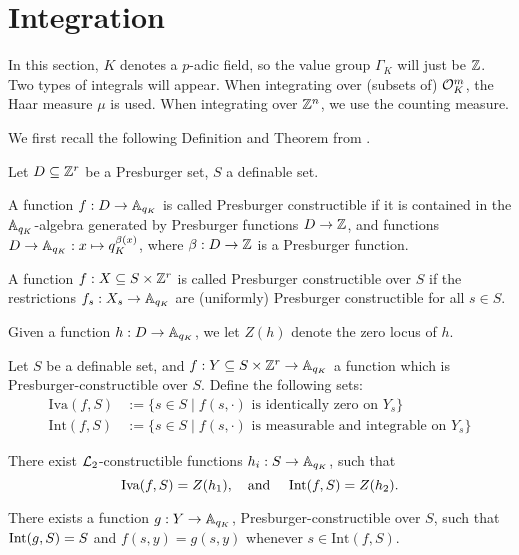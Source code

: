 \section{Integration} \label{sec:integration}
In this section, $K$ denotes a $p$-adic field, so the value group $\Gamma_K$ will just be $\Z$. Two types of integrals will appear. When integrating over (subsets of) $\cO_K^m$, the Haar measure $\mu$ is used. When integrating over $\Z^n$, we use the counting measure.

We first recall the following Definition and Theorem from \cite{Clu-Gor-Hal-14}.
\begin{defn}Let $D \subseteq \ZZ^r$ be a Presburger set, $S$ a definable set.
\item A function $f: D \to \AA_{q_K}$ is called Presburger constructible if it is contained in the $\AA_{q_K}$-algebra generated by Presburger functions $D\to \ZZ$, and functions $D\to \AA_{q_K}: x \mapsto q_K^{\beta(x)}$, where $\beta:D \to \ZZ$ is a Presburger function.
\item A function $f:X\subseteq S \times \ZZ^r$ is called Presburger constructible over $S$ if  the restrictions $f_s: X_s \to \AA_{q_K}$ are (uniformly) Presburger constructible for all $s \in S$. 
\item Given a function $h:D\to \AA_{q_K}$, we let $Z(h)$ denote the zero locus of $h$.
\end{defn}
\begin{def-theorem}\label{thm:presburgerloci} Let $S$ be a definable set, 
and $f:Y\subseteq S\times \ZZ^r\to \AA_{q_K}$ a function which is Presburger-constructible over $S$. Define the following sets:
\begin{align*}
\text{Iva}(f,S)&:=\{s \in S \mid f(s, \cdot) \text{ is identically zero on } Y_s\}\\
\text{Int}(f,S) &:=\{s \in S \mid f(s, \cdot) \text{ is measurable and integrable on } Y_s \}
\end{align*}
\item There exist $\Lm_2$-constructible functions $h_i: S \to \AA_{q_K}$, such that 
\[\text{Iva}(f,S) = Z(h_1), \text{\quad and \quad }
\text{Int}(f,S) = Z(h_2).\]
\item There exists a function $g: Y \to \AA_{q_K}$, Presburger-constructible over $S$, such that $\Int(g,S) = S$ and $f(s,y) = g(s,y)$ whenever $s \in \text{Int}(f,S)$.
\end{def-theorem}
